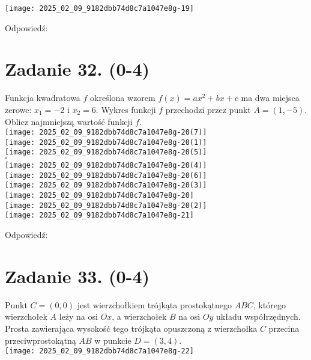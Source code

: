 \documentclass[10pt]{article}
\begin{document}
\begin{center}
\texttt{[image: 2025\_02\_09\_9182dbb74d8c7a1047e8g-19]}
\end{center}

Odpowiedź:

\section*{Zadanie 32. (0-4)}
Funkcja kwadratowa \(f\) określona wzorem \(f(x)=a x^{2}+b x+c\) ma dwa miejsca zerowe: \(x_{1}=-2\) i \(x_{2}=6\). Wykres funkcji \(f\) przechodzi przez punkt \(A=(1,-5)\). Oblicz najmniejszą wartość funkcji \(f\).\\
\texttt{[image: 2025\_02\_09\_9182dbb74d8c7a1047e8g-20(7)]}\\
\(\qquad\)\\
\(\qquad\)\\
\texttt{[image: 2025\_02\_09\_9182dbb74d8c7a1047e8g-20(1)]}\\
\texttt{[image: 2025\_02\_09\_9182dbb74d8c7a1047e8g-20(5)]}\\
\(\qquad\)\\
\(\qquad\)\\
\(\square\)\\
\texttt{[image: 2025\_02\_09\_9182dbb74d8c7a1047e8g-20(4)]}\\
\(\qquad\)\\
\texttt{[image: 2025\_02\_09\_9182dbb74d8c7a1047e8g-20(6)]}\\
\(\qquad\)\\
\texttt{[image: 2025\_02\_09\_9182dbb74d8c7a1047e8g-20(3)]}\\
\(\qquad\)\\
\texttt{[image: 2025\_02\_09\_9182dbb74d8c7a1047e8g-20]}\\
\(\qquad\)\\
\texttt{[image: 2025\_02\_09\_9182dbb74d8c7a1047e8g-20(2)]}\\
\(\qquad\)\\
\texttt{[image: 2025\_02\_09\_9182dbb74d8c7a1047e8g-21]}

Odpowiedź:

\section*{Zadanie 33. (0-4)}
Punkt \(C=(0,0)\) jest wierzchołkiem trójkąta prostokątnego \(A B C\), którego wierzchołek \(A\) leży na osi \(O x\), a wierzchołek \(B\) na osi \(O y\) układu współrzędnych. Prosta zawierająca wysokość tego trójkąta opuszczoną z wierzchołka \(C\) przecina przeciwprostokątną \(A B\) w punkcie \(D=(3,4)\).\\
\texttt{[image: 2025\_02\_09\_9182dbb74d8c7a1047e8g-22]}
\end{document}

